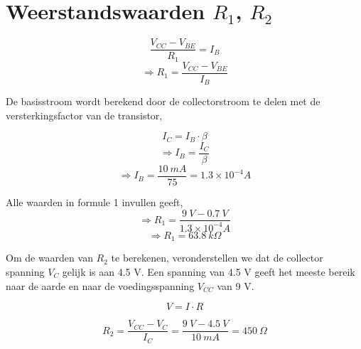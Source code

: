 \documentclass{report}
\begin{document}
\section{Weerstandswaarden $R_1$, $R_2$}

\begin{equation}
\frac{V_{CC}-V_{BE}}{R_1}=I_B 
\end{equation}
$$\Rightarrow R_1=\frac{V_{CC}-V_{BE}}{I_B}$$

\noindent De basisstroom wordt berekend door de collectorstroom te delen met de versterkingsfactor van de transistor,

\begin{equation}
I_C=I_B \cdot \beta
\end{equation}
$$\Rightarrow I_B=\frac{I_C}{\beta}$$
$$\Rightarrow I_B=\frac{10 \: mA}{75}=1.3\times 10^{-4}A$$

\noindent Alle waarden in formule 1 invullen geeft,
$$\Rightarrow R_1=\frac{9\: V-0.7\: V}{1.3\times 10^{-4}A}$$
$$\Rightarrow R_1=63.8 \: k  \Omega$$

\noindent Om de waarden van $R_2$ te berekenen, veronderstellen we dat de collector spanning $V_C$ gelijk is aan 4.5 V. Een spanning van 4.5 V geeft het meeste bereik naar de aarde en naar de voedingsspanning $V_{CC}$ van 9 V. 

\begin{equation}
V = I \cdot R 
\end{equation}

$$R_2 = \frac{V_{CC}-V_C}{I_C} = \frac{9\:V-4.5\:V}{10\:mA}=450\: \Omega$$
\end{document}

